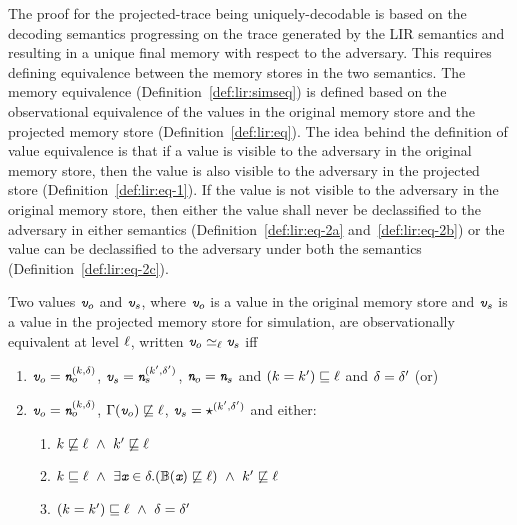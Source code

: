The proof for the projected-trace being uniquely-decodable is based on the
decoding semantics progressing on the trace generated by the LIR
semantics and resulting in a unique final memory with respect to the 
adversary. This requires defining equivalence between the memory 
stores in the two semantics. The memory equivalence
(Definition~\ref{def:lir:simseq}) is defined based on the 
observational equivalence of the values in the original memory store and 
the projected memory store (Definition~\ref{def:lir:eq}). 
The idea behind the definition of value equivalence is that if a value is 
visible to the adversary in the original memory store, then the value is 
also visible to the adversary in the projected store 
(Definition~\ref{def:lir:eq-1}). If the value is not visible to the 
adversary in the original memory store, then either the value shall never 
be declassified to the adversary in either semantics 
(Definition~\ref{def:lir:eq-2a} and~\ref{def:lir:eq-2b}) or the value can 
be declassified to the adversary under both the semantics 
(Definition~\ref{def:lir:eq-2c}). 

\begin{mydef}
\label{def:lir:eq}
Two values $\emph{\texttt{v}}_o$ and $\emph{\texttt{v}}_s$, where $\emph{\texttt{v}}_o$ is a value in the original
memory store and $\emph{\texttt{v}}_s$ is a value in the projected memory store for
simulation, are observationally equivalent at level $\ell$,
written $\emph{\texttt{v}}_o \simeq_\ell \emph{\texttt{v}}_s$ iff
\begin{enumerate}[label=\emph{\arabic*}., ref={\ref{def:lir:eq}.\arabic*}]
\item\label{def:lir:eq-1} $\emph{\texttt{v}}_o = \emph{\texttt{n}}_o^{(k, \delta)}$, $\emph{\texttt{v}}_s =
  \emph{\texttt{n}}_s^{(k',\delta')}$, $\emph{\texttt{n}}_o = \emph{\texttt{n}}_s$ and
  $(k = k') \sqsubseteq \ell$ and $\delta = \delta'$ (or)
\item\label{def:lir:eq-2} $\emph{\texttt{v}}_o = \emph{\texttt{n}}_o^{(k, \delta)}$, $\Gamma(\emph{\texttt{v}}_o) \not\sqsubseteq
  \ell$,  $\emph{\texttt{v}}_s = \star^{(k',\delta')}$ and either:
  \begin{enumerate}[label=\emph{(\alph*)}, ref={\ref{def:lir:eq-2}(\alph*)}]
  \item\label{def:lir:eq-2a} $k \not\sqsubseteq \ell ~\wedge ~k'
    \not\sqsubseteq \ell$
  \item \label{def:lir:eq-2b} $k \sqsubseteq \ell~\wedge~\exists \emph{\texttt{x}} \in
    \delta. (\mathbb{B}(\emph{\texttt{x}}) \not\sqsubseteq \ell) ~\wedge ~k' \not\sqsubseteq
    \ell$
  \item\label{def:lir:eq-2c} $(k = k') \sqsubseteq \ell~ \wedge
    ~\delta = \delta'$
  \end{enumerate}
\end{enumerate}
\end{mydef}

